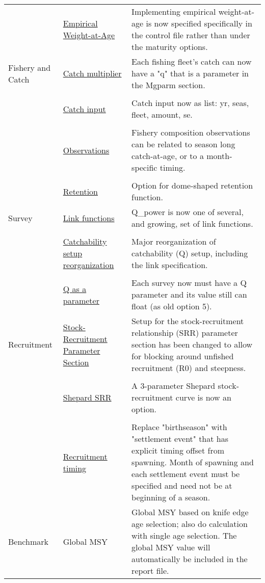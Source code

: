 \documentclass[12pt]{article}
\begin{document}
\begin{center}
\begin{longtable}{p{2cm} p{3cm} p{10cm}}
	\\
	& \hyperlink{WAA} {Empirical Weight-at-Age} & Implementing empirical weight-at-age is now specified specifically in the control file rather than under the maturity options.\\
	\pagebreak%
	Fishery and Catch & 
	\hyperlink{CatchMult}{Catch multiplier} & 
	Each fishing fleet's catch can now have a "q" that is a parameter in the Mgparm section.\\
	\\						
	& \hyperlink{CatchFormat}{Catch input} & 
	Catch input now as list:  yr, seas, fleet, amount, se. \\
	\\						
	& \hyperlink{CompTiming}{Observations} & 
	Fishery composition observations can be related to season long catch-at-age, or to a month-specific timing.\\
	\\					
	& \hyperlink{DomeRetention}{Retention} & 
	Option for dome-shaped retention function. \\
	\hline
	Survey  
	& \hyperlink{Qsetup}{Link functions} & 
	Q\_power is now one of several, and growing, set of link functions. \\
	\\						
	& \hyperlink{Qsetup}{Catchability setup reorganization} & 
	Major reorganization of catchability (Q) setup, including the link specification. \\
	\\					
	& \multicolumn{1}{l}{\hyperlink{Qsetup}{Q as a parameter}} & 
	Each survey now must have a Q parameter and its value still can float (as old option 5).\\
	\hline
	Recruitment
	& \hyperlink{SRR}{Stock-Recruitment Parameter Section} & Setup for the stock-recruitment relationship (SRR) parameter section has been changed to allow for blocking around unfished recruitment (R0) and steepness.\\ 
	\\
	& \hyperlink{Shepard}{Shepard SRR} & 
	A 3-parameter Shepard stock-recruitment curve is now an option.\\
	\\
	& \hyperlink{RecrTiming}{Recruitment timing} & 
	Replace "birthseason" with "settlement event" that has explicit timing offset from spawning.  Month of spawning and each settlement event must be specified and need not be at beginning of a season.\\
	\hline
	Benchmark 
	& Global MSY &  
	Global MSY based on knife edge age selection; also do calculation with single age selection. The global MSY value will automatically be included in the report file.\\

\end{longtable}
\end{center}
\end{document}
